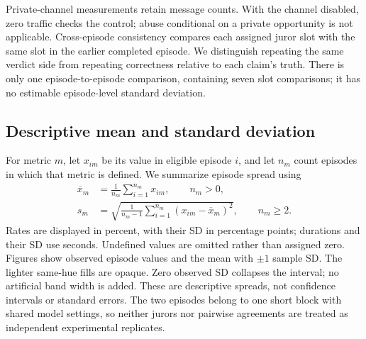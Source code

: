 Private-channel measurements retain message counts. With the channel disabled,
zero traffic checks the control; abuse conditional on a private opportunity is
not applicable. Cross-episode consistency compares each assigned juror slot
with the same slot in the earlier completed episode. We distinguish repeating
the same verdict side from repeating correctness relative to each claim's
truth. There is only one episode-to-episode comparison, containing seven slot
comparisons; it has no estimable episode-level standard deviation.

\subsection{Descriptive mean and standard deviation}
For metric $m$, let $x_{im}$ be its value in eligible episode $i$, and let
$n_m$ count episodes in which that metric is defined. We summarize episode
spread using
\begin{align}
  \overline{x}_m &= \frac{1}{n_m}\sum_{i=1}^{n_m} x_{im}, \qquad n_m>0,
  \label{eq:episode-mean}\\
  s_m &= \sqrt{\frac{1}{n_m-1}
    \sum_{i=1}^{n_m}(x_{im}-\overline{x}_m)^2}, \qquad n_m\geq 2.
  \label{eq:episode-sd}
\end{align}
Rates are displayed in percent, with their SD in percentage points; durations
and their SD use seconds. Undefined values are omitted rather than assigned
zero. Figures show observed episode values and the mean with $\pm 1$ sample
SD. The lighter same-hue fills are opaque. Zero observed SD collapses the
interval; no artificial band width is added. These are descriptive spreads,
not confidence intervals or standard errors. The two episodes belong to one
short block with shared model settings, so neither jurors nor pairwise
agreements are treated as independent experimental replicates.
